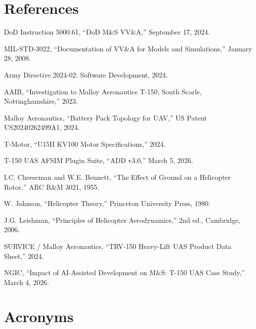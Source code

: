 \documentclass[11pt, letterpaper]{article}
\begin{document}
\pagebreak

\section{\unclass References}

\unclass [1] DoD Instruction 5000.61, ``DoD M\&S VV\&A,'' September 17, 2024.

\unclass [2] MIL-STD-3022, ``Documentation of VV\&A for Models and Simulations,'' January 28, 2008.

\unclass [3] Army Directive 2024-02: Software Development, 2024.

\unclass [4] AAIB, ``Investigation to Malloy Aeronautics T-150, South Scarle, Nottinghamshire,'' 2023.

\unclass [5] Malloy Aeronautics, ``Battery Pack Topology for UAV,'' US Patent US20240262499A1, 2024.

\unclass [6] T-Motor, ``U15II KV100 Motor Specifications,'' 2024.

\unclass [7] T-150 UAS AFSIM Plugin Suite, ``ADD v3.0,'' March 5, 2026.

\unclass [8] I.C. Cheeseman and W.E. Bennett, ``The Effect of Ground on a Helicopter Rotor,'' ARC R\&M 3021, 1955.

\unclass [9] W. Johnson, ``Helicopter Theory,'' Princeton University Press, 1980.

\unclass [10] J.G. Leishman, ``Principles of Helicopter Aerodynamics,'' 2nd ed., Cambridge, 2006.

\unclass [11] SURVICE / Malloy Aeronautics, ``TRV-150 Heavy-Lift UAS Product Data Sheet,'' 2024.

\unclass [12] NGIC, ``Impact of AI-Assisted Development on M\&S: T-150 UAS Case Study,'' March 4, 2026.

\pagebreak

\section{\unclass Acronyms}
\end{document}
